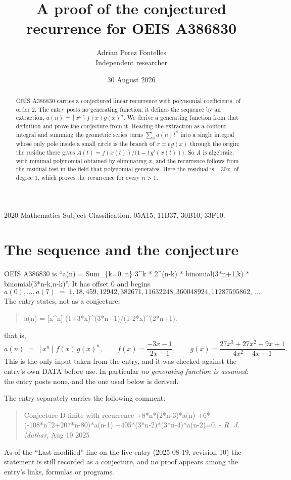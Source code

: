 \documentclass[11pt,a4paper]{article}
\title{A proof of the conjectured recurrence for OEIS A386830}
\author{Adrian Perez Fontelles\\ \small Independent researcher}
\date{30 August 2026}
\theoremstyle{plain}
\theoremstyle{definition}
\begin{document}
\maketitle

\begin{abstract}
OEIS A386830 carries a conjectured linear recurrence with polynomial coefficients, of
order 2. The entry posts no generating function; it defines the sequence by an
extraction, $a(n)=[x^{n}]\,f(x)g(x)^{n}$. We derive a generating function from that
definition and prove the conjecture from it. Reading the extraction as a contour integral
and summing the geometric series turns $\sum_{n}a(n)t^{n}$ into a single integral whose
only pole inside a small circle is the branch of $x=t\,g(x)$ through the origin; the
residue there gives $A(t)=f(x(t))/\bigl(1-t\,g'(x(t))\bigr)$. So $A$ is algebraic, with
minimal polynomial obtained by eliminating $x$, and the recurrence follows from the
residual test in the field that polynomial generates. Here the residual is
$- 30 x$, of degree $1$, which proves the recurrence for every $n>1$.
\end{abstract}

\noindent\small 2020 Mathematics Subject Classification. 05A15, 11B37, 30B10, 33F10.\normalsize

\section{The sequence and the conjecture}

OEIS A386830 is ``a(n) = Sum\_\{k=0..n\} 3\^{}k * 2\^{}(n-k) * binomial(3*n+1,k) * binomial(3*n-k,n-k)''. It has offset $0$ and begins
\[
a(0),\dots,a(7)\;=\;1, 18, 459, 12942, 382671, 11632248, 360048924, 11287595862,\ \dots
\]
The entry states, not as a conjecture,
\begin{quote}\small
a(n) = [x\^{}n] (1+3*x)\^{}(3*n+1)/(1-2*x)\^{}(2*n+1).
\end{quote}
that is,
\begin{equation}\label{eq:def}
a(n)\;=\;[x^{n}]\,f(x)\,g(x)^{n},
\qquad f(x)=\frac{- 3 x - 1}{2 x - 1},\qquad g(x)=\frac{27 x^{3} + 27 x^{2} + 9 x + 1}{4 x^{2} - 4 x + 1} .
\end{equation}
This is the only input taken from the entry, and it was checked against the entry's own
DATA before use. In particular \emph{no generating function is assumed}: the entry posts
none, and the one used below is derived.

The entry separately carries the following comment:
\begin{quote}\small
Conjecture D-finite with recurrence +8*n*(2*n-3)*a(n) +6*(-108*n\^{}2+207*n-80)*a(n-1) +405*(3*n-2)*(3*n-4)*a(n-2)=0. - \emph{R. J. Mathar}, Aug 19 2025
\end{quote}
As of the ``Last modified'' line on the live entry (2025-08-19, revision 10) the
statement is still recorded as a conjecture, and no proof appears among the entry's links,
formulas or programs.
\end{document}

